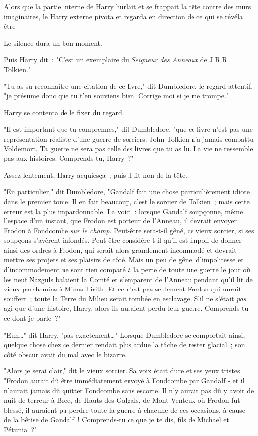Alors que la partie interne de Harry hurlait et se frappait la tête contre des murs imaginaires, le Harry externe pivota et regarda en direction de ce qui se révéla être -

Le silence dura un bon moment.

Puis Harry dit~: "C'est un exemplaire du \emph{Seigneur des Anneaux} de J.R.R Tolkien."

"Tu as su reconnaître une citation de ce livre," dit Dumbledore, le regard attentif, "je présume donc que tu t'en souviens bien. Corrige moi si je me trompe."

Harry se contenta de le fixer du regard.

"Il est important que tu comprennes," dit Dumbledore, "que ce livre n'est pas une représentation réaliste d'une guerre de sorciers. John Tolkien n'a jamais combattu Voldemort. Ta guerre ne sera pas celle des livres que tu as lu. La vie ne ressemble pas aux histoires. Comprends-tu, Harry~?"

Assez lentement, Harry acquiesça~; puis il fit non de la tête.

"En particulier," dit Dumbledore, "Gandalf fait une chose particulièrement idiote dans le premier tome. Il en fait beaucoup, c'est le sorcier de Tolkien~; mais cette erreur est la plus impardonnable. La voici~: lorsque Gandalf soupçonne, même l'espace d'un instant, que Frodon est porteur de l'Anneau, il devrait envoyer Frodon à Fondcombe \emph{sur le champ}. Peut-être sera-t-il gêné, ce vieux sorcier, si ses soupçons s'avèrent infondés. Peut-être considère-t-il qu'il est impoli de donner ainsi des ordres à Frodon, qui serait alors grandement incommodé et devrait mettre ses projets et ses plaisirs de côté. Mais un peu de gêne, d'impolitesse et d'incommodement ne sont rien comparé à la perte de toute une guerre le jour où les neuf Nazguls balaient la Comté et s'emparent de l'Anneau pendant qu'il lit de vieux parchemins à Minas Tirith. Et ce n'est pas seulement Frodon qui aurait souffert~; toute la Terre du Milieu serait tombée en esclavage. S'il ne s'était \emph{pas} agi que d'une histoire, Harry, alors ils auraient perdu leur guerre. Comprends-tu ce dont je parle~?"

"Euh…" dit Harry, "pas exactement…" Lorsque Dumbledore se comportait ainsi, quelque chose chez ce dernier rendait plus ardue la tâche de rester glacial~; son côté obscur avait du mal avec le bizarre.

"Alors je serai clair," dit le vieux sorcier. Sa voix était dure et ses yeux tristes. "Frodon aurait dû être immédiatement envoyé à Fondcombe par Gandalf - et il n'aurait jamais dû quitter Fondcombe sans escorte. Il n'y aurait pas dû y avoir de nuit de terreur à Bree, de Hauts des Galgals, de Mont Venteux où Frodon fut blessé, il auraient pu perdre toute la guerre à chacune de ces occasions, à cause de la bêtise de Gandalf~! Comprends-tu ce que je te dis, fils de Michael et Pétunia~?"

